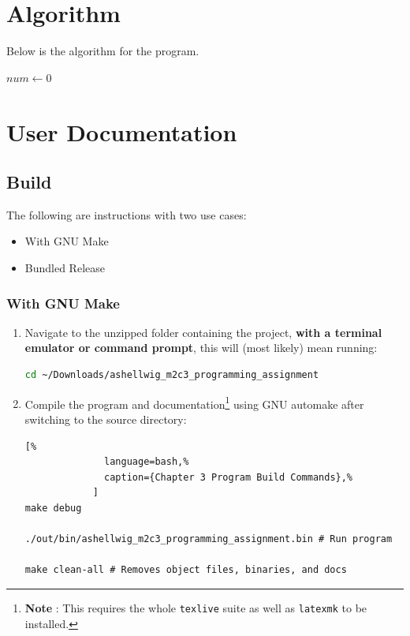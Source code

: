 \documentclass[a4paper, 11pt]{article}
\begin{document}
  \newpage
  \section{Algorithm}
    Below is the algorithm for the program.
    \begin{algorithm}[h]
      \caption{Chapter 3 Program Algorithm}
      \vspace{12pt}
      \begin{algorithmic}[1]
        \State
          \State $num\gets 0$
        \EndFunction
      \end{algorithmic}
      \label{alg:c3program}
    \end{algorithm}


  \newpage
  \section{User Documentation}

    \subsection{Build}
      The following are instructions with two use cases:
      \begin{itemize}
        \item With GNU Make
        \item Bundled Release
      \end{itemize}
      \subsubsection{With GNU Make}
        \begin{enumerate}
          \item Navigate to the unzipped folder containing the project,
            \textbf{with a terminal emulator or command prompt}, this will
            (most likely) mean running:
            \begin{lstlisting}[language=bash]
cd ~/Downloads/ashellwig_m2c3_programming_assignment
            \end{lstlisting}
          \item Compile the program and documentation\footnote{\textbf{Note%
            }: This requires the whole \texttt{texlive} suite as well as
            \texttt{latexmk} to be installed.} using GNU automake after
            switching to the source directory:
            \begin{lstlisting}[%
              language=bash,%
              caption={Chapter 3 Program Build Commands},%
            ]
make debug

./out/bin/ashellwig_m2c3_programming_assignment.bin # Run program

make clean-all # Removes object files, binaries, and docs
            \end{lstlisting}
          \end{enumerate}
\end{document}
